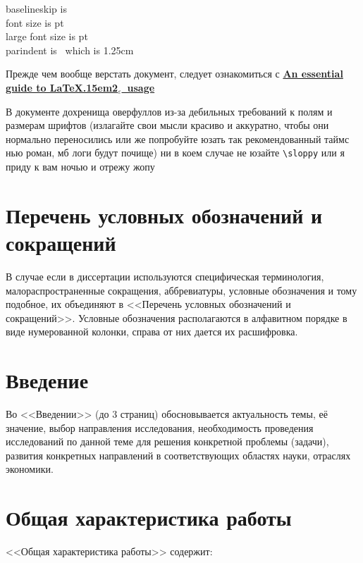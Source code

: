 \documentclass{mpaper}
\renewcommand{\LaTeXe}{\LaTeX\kern.15em2$_{\textstyle\varepsilon}$}
\begin{document}
    \maketitle
    \setcounter{tocdepth}{3}
    \setcounter{page}{2}
    \tableofcontents

    \newpage
    \noindent baselineskip is \the\baselineskip\\
    font size is \makeatletter\f@size\makeatother pt\\
    large font size is {\normalsizerrr \makeatletter\f@size\makeatother} pt\\
    parindent is \the\parindent\ which is 1.25cm

    Прежде чем вообще верстать документ, следует ознакомиться с \href{http://anorien.csc.warwick.ac.uk/mirrors/CTAN/info/l2tabu/english/l2tabuen.pdf}{\bfseries An essential guide to \LaTeXe\ usage}

    В документе дохренища оверфуллов из-за дебильных требований к полям и размерам шрифтов (излагайте свои мысли красиво и аккуратно, чтобы они нормально переносились или же попробуйте юзать так рекомендованный таймс нью роман, мб логи будут почище) ни в коем случае не юзайте \verb|\sloppy| или я приду к вам ночью и отрежу жопу
    \chapter*{Перечень условных обозначений и сокращений}
    В случае если в диссертации используются специфическая терминология, малораспространенные сокращения, аббревиатуры, условные обозначения и тому подобное, их объединяют в <<Перечень условных обозначений и сокращений>>. Условные обозначения располагаются в алфавитном порядке в виде нумерованной колонки, справа от них дается их расшифровка.
    \chapter*{Введение}
    Во <<Введении>> (до 3 страниц) обосновывается актуальность темы, её значение, выбор направления исследования, необходимость проведения исследований по данной теме для решения конкретной проблемы (задачи), развития конкретных направлений в соответствующих областях науки, отраслях экономики.

    \chapter{Общая характеристика работы}
    <<Общая характеристика работы>> содержит:
\end{document}
